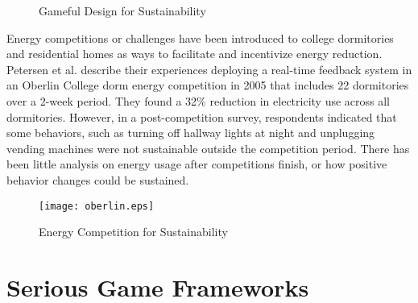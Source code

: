  \begin{figure}[htbp]
	\centering
		\caption{Gameful Design for Sustainability}
		\label{fig:ixd}
\end{figure}	

Energy competitions or challenges have been introduced to college dormitories and residential homes as ways to facilitate and incentivize energy reduction. Petersen et al. \cite{petersen-dorm-energy-reduction} describe their experiences deploying a real-time feedback system in an Oberlin College dorm energy competition in 2005 that includes 22 dormitories over a 2-week period. They found a 32\% reduction in electricity use across all dormitories. However, in a post-competition survey, respondents indicated that some behaviors, such as turning off hallway lights at night and unplugging vending machines were not sustainable outside the competition period.  There has been little analysis on energy usage after competitions finish, or how positive behavior changes could be sustained.

\begin{figure}[htbp]
	\centering
		\texttt{[image: oberlin.eps]}
		\caption{Energy Competition for Sustainability}
		\label{fig:oberlin}
\end{figure}

\section{Serious Game Frameworks}


